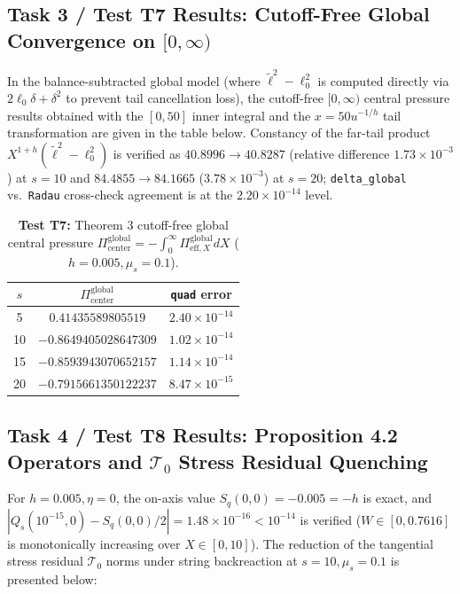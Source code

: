 \documentclass[12pt,a4paper]{article}
\begin{document}
\subsection{Task 3 / Test T7 Results: Cutoff-Free Global Convergence on $[0,\infty)$}

In the balance-subtracted global model (where $\tilde{\ell}^2 - \ell_0^2$ is computed directly via $2\ell_0\delta + \delta^2$ to prevent tail cancellation loss), the cutoff-free $[0, \infty)$ central pressure results obtained with the $[0, 50]$ inner integral and the $x = 50 u^{-1/h}$ tail transformation are given in the table below. Constancy of the far-tail product $X^{1+h}(\tilde{\ell}^2 - \ell_0^2)$ is verified as $40.8996 \to 40.8287$ (relative difference $1.73 \times 10^{-3}$) at $s=10$ and $84.4855 \to 84.1665$ ($3.78 \times 10^{-3}$) at $s=20$; \texttt{delta\_global} vs.\ \texttt{Radau} cross-check agreement is at the $2.20 \times 10^{-14}$ level.

\begin{table}[htbp]
\centering
\footnotesize
\caption{\textbf{Test T7:} Theorem 3 cutoff-free global central pressure $\Pi_{\mathrm{center}}^{\mathrm{global}} = -\int_0^\infty \Pi_{\mathrm{eff},X}^{\mathrm{global}} dX$ ($h=0.005, \mu_s=0.1$).}
\vspace{0.1cm}
\begin{tabular}{c|c|c}
\hline
$s$ & $\Pi_{\mathrm{center}}^{\mathrm{global}}$ & \texttt{quad} error \\
\hline
5 & $0.41435589805519$ & $2.40\times 10^{-14}$ \\
10 & $-0.8649405028647309$ & $1.02\times 10^{-14}$ \\
15 & $-0.8593943070652157$ & $1.14\times 10^{-14}$ \\
20 & $-0.7915661350122237$ & $8.47\times 10^{-15}$ \\
\hline
\end{tabular}
\end{table}

\subsection{Task 4 / Test T8 Results: Proposition 4.2 Operators and $\mathcal{T}_0$ Stress Residual Quenching}

For $h=0.005, \eta=0$, the on-axis value $S_q(0,0) = -0.005 = -h$ is exact, and $|Q_s(10^{-15}, 0) - S_q(0,0)/2| = 1.48 \times 10^{-16} < 10^{-14}$ is verified ($W \in [0, 0.7616]$ is monotonically increasing over $X \in [0,10]$). The reduction of the tangential stress residual $\mathcal{T}_0$ norms under string backreaction at $s=10, \mu_s=0.1$ is presented below:
\end{document}
